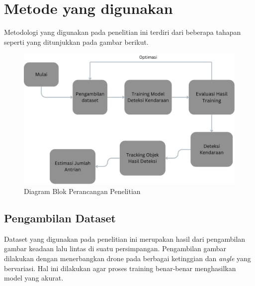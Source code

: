 
\section{Metode yang digunakan}
Metodologi yang digunakan pada penelitian ini terdiri dari beberapa tahapan seperti yang ditunjukkan pada gambar berikut.
\begin{figure} [H] \centering
  \includegraphics[scale=0.45]{gambar/Blok Diagram Pra-TA NEW.png}
  \caption{Diagram Blok Perancangan Penelitian}
  \label{fig:diagaram_blok}
\end{figure}

\subsection{Pengambilan Dataset}
Dataset yang digunakan pada penelitian ini merupakan hasil dari pengambilan gambar keadaan lalu lintas di suatu persimpangan. Pengambilan gambar dilakukan dengan menerbangkan drone pada berbagai ketinggian dan \emph{angle} yang bervariasi. Hal ini dilakukan agar proses training benar-benar menghasilkan model yang akurat.

